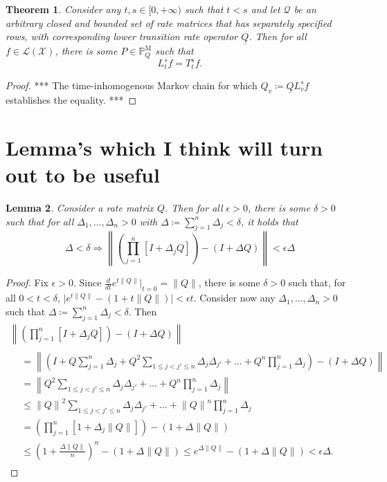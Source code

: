 \documentclass[a4paper,reqno]{amsart}
\newtheorem{theorem}{Theorem}
\newtheorem{lemma}[theorem]{Lemma}
\newcommand{\states}{\mathcal{X}}
\newcommand{\processes}{\mathbb{P}}
\newcommand{\mprocesses}{\processes^{\mathrm{M}}}
\newcommand{\lbound}{L}
\newcommand{\gambles}{\mathcal{L}}
\newcommand{\gamblesX}{\gambles(\states)}
\newcommand{\rateset}{\mathcal{Q}}
\newcommand{\lrate}{\underline{Q}}
\newcommand{\then}{\Rightarrow}
\begin{document}
\begin{theorem}
Consider any $t,s\in[0,+\infty)$ such that $t<s$ and let $\rateset$ be an arbitrary closed and bounded set of rate matrices that has separately specified rows, with corresponding lower transition rate operator $\lrate$. Then for all $f\in\gamblesX$, there is some $P\in\mprocesses_Q$ such that
\begin{equation*}
\lbound_t^sf=T_t^sf.
\end{equation*}
\end{theorem}
\begin{proof}
*** The time-inhomogenous Markov chain for which $Q_v\coloneqq\lrate\lbound_v^sf$ establishes the equality. ***
\end{proof}

\section{Lemma's which I think will turn out to be useful}

\begin{lemma}\label{lemma:smallerpartition}
Consider a rate matrix $Q$. Then for all $\epsilon>0$, there is some $\delta>0$ such that for all $\Delta_1,\dots,\Delta_n>0$ with $\Delta\coloneqq\sum_{j=1}^n\Delta_j<\delta$, it holds that
\begin{equation*}
\Delta<\delta\then\left\lVert\left(\prod_{j=1}^n[I+\Delta_j Q]\right)-(I+\Delta Q)\right\rVert<\epsilon\Delta
\end{equation*}


\end{lemma}
\begin{proof}
Fix $\epsilon>0$. Since $\frac{d}{dt}e^{t\lVert Q\rVert}\vert_{t=0}=\lVert Q\rVert$, there is some $\delta>0$ such that, for all $0<t<\delta$, $\big\vert e^{t\lVert Q\rVert}- (1+t\lVert Q\rVert)\big\vert<\epsilon t$. Consider now any $\Delta_1,\dots,\Delta_n>0$ such that $\Delta\coloneqq\sum_{j=1}^n\Delta_j<\delta$. Then
\begin{multline*}
\left\lVert\left(\prod_{j=1}^n[I+\Delta_j Q]\right)-(I+\Delta Q)\right\rVert\\
\begin{aligned}
&=
\left\lVert\left(I+Q\sum_{j=1}^n\Delta_j+Q^2\sum_{1\leq j<j'\leq n}\Delta_j\Delta_{j'}+ \dots +Q^n\prod_{j=1}^n\Delta_j\right)-(I+\Delta Q)\right\rVert\\
&=
\left\lVert Q^2\sum_{1\leq j<j'\leq n}\Delta_j\Delta_{j'}+ \dots +Q^n\prod_{j=1}^n\Delta_j \right\rVert\\
&\leq
{\lVert Q\rVert}^2\sum_{1\leq j<j'\leq n}\Delta_j\Delta_{j'}+ \dots +{\lVert Q\rVert}^n\prod_{j=1}^n\Delta_j\\
&=\left(\prod_{j=1}^n[1+\Delta_j\lVert Q\rVert]\right)-(1+\Delta\lVert Q\rVert)\\
&\leq \left(1+\frac{\Delta\lVert Q\rVert}{n}\right)^n-(1+\Delta\lVert Q\rVert)
\leq e^{\Delta\lVert Q\rVert}-(1+\Delta\lVert Q\rVert)
<\epsilon\Delta.
\end{aligned}
\end{multline*}
\end{proof}


 
%
\end{document}
